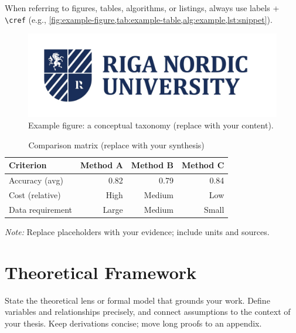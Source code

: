 When referring to figures, tables, algorithms, or listings, always use labels + \verb|\cref| (e.g., \cref{fig:example-figure,tab:example-table,alg:example,lst:snippet}).

\begin{figure}[h]
  \centering
  \includegraphics[width=0.7\linewidth]{b_chapters/chapter1/assets/RNU_large_logo.png}
  \caption{Example figure: a conceptual taxonomy (replace with your content).}
  \label{fig:example-figure}
\end{figure}

{\singlespacing
\begin{table}[h]
  \caption{Comparison matrix (replace with your synthesis)}
  \label{tab:example-table}
  \centering
  \begin{tabular}{lrrr}
    \toprule
    Criterion            & Method A & Method B & Method C\\
    \midrule
    Accuracy (avg)       & 0.82     & 0.79     & 0.84\\
    Cost (relative)      & High     & Medium   & Low\\
    Data requirement     & Large    & Medium   & Small\\
    \bottomrule
  \end{tabular}

  \vspace{2mm}
  \emph{Note:} Replace placeholders with your evidence; include units and sources.
\end{table}
}

\section{Theoretical Framework}
\label{sec:theory}
State the theoretical lens or formal model that grounds your work. Define variables and relationships precisely, and connect assumptions to the context of your thesis. Keep derivations concise; move long proofs to an appendix.

